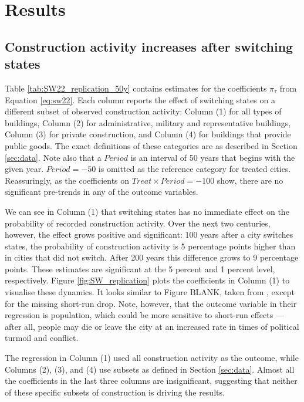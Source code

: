 \documentclass[11pt, a4paper]{article}
\begin{document}

\section{Results} \label{sec:results}

\subsection{Construction activity increases after switching states}

Table \ref{tab:SW22_replication_50y} contains estimates for the coefficients $\pi_\tau$ from Equation \eqref{eq:sw22}. Each column reports the effect of switching states on a different subset of observed construction activity: Column (1) for all types of buildings, Column (2) for administrative, military and representative buildings, Column (3) for private construction, and Column (4) for buildings that provide public goods. The exact definitions of these categories are as described in Section \ref{sec:data}. Note also that a $Period$ is an interval of 50 years that begins with the given year. $Period = -50$ is omitted as the reference category for treated cities. Reassuringly, as the coefficients on $Treat \times Period = -100$ show, there are no significant pre-trends in any of the outcome variables. 

We can see in Column (1) that switching states has no immediate effect on the probability of recorded construction activity. Over the next two centuries, however, the effect grows positive and significant: 100 years after a city switches states, the probability of construction activity is 5 percentage points higher than in cities that did not switch. After 200 years this difference grows to 9 percentage points. These estimates are significant at the 5 percent and 1 percent level, respectively. Figure \ref{fig:SW_replication} plots the coefficients in Column (1) to visualise these dynamics. It looks similar to Figure BLANK, taken from \cite{schoenholzer2022}, except for the missing short-run drop. Note, however, that the outcome variable in their regression is population, which could be more sensitive to short-run effects --- after all, people may die or leave the city at an increased rate in times of political turmoil and conflict. 

The regression in Column (1) used all construction activity as the outcome, while Columns (2), (3), and (4) use subsets as defined in Section \ref{sec:data}. Almost all the coefficients in the last three columns are insignificant, suggesting that neither of these specific subsets of construction is driving the results. 
\end{document}

